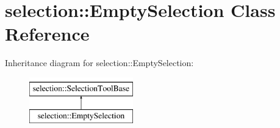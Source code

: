 \hypertarget{classselection_1_1EmptySelection}{\section{selection\-:\-:Empty\-Selection Class Reference}
\label{classselection_1_1EmptySelection}
}
Inheritance diagram for selection\-:\-:Empty\-Selection\-:\begin{figure}[H]
\begin{center}
\leavevmode
\includegraphics[height=2.000000cm]{classselection_1_1EmptySelection}
\end{center}
\end{figure}

